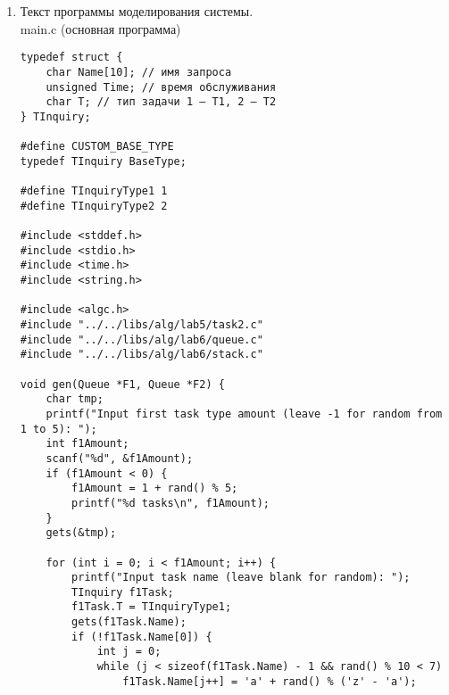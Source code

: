 \documentclass[a4paper,14pt]{extarticle}
\begin{document}
\begin{enumerate}
\begin{verbatim}
int QueueError = QueueOk; 

void InitQueue(Queue* f) {
    f->Uk1 = 0;
    f->Uk2 = 0;
    f->N = 0;

    QueueError = QueueOk;
}

void PutQueue(Queue *f, BaseType E) {
    if (f->N >= QueueSize) {
        QueueError = QueueOver;
        return;
    }

    QueueError = QueueOk;
    f->Buf[f->Uk2] = E;
    f->Uk2 = (f->Uk2 + 1) % QueueSize;
    f->N++;
}

void GetQueue(Queue *f, BaseType *E) {
    if (f->N <= 0) {
        QueueError = QueueUnder;
        return;
    }

    QueueError = QueueOk;
    *E = f->Buf[f->Uk1];
    f->Uk1 = (f->Uk1 + 1) % QueueSize;
    f->N--;
}

void ReadQueue(Queue *f, BaseType *E) {
    if (f->N <= 0) {
        QueueError = QueueUnder;
        return;
    }

    QueueError = QueueOk;
    *E = f->Buf[f->Uk1];
}

int EmptyQueue(Queue *f) {
    QueueError = QueueOk;
    
    return f->N == 0;
}
\end{verbatim}
    \item Текст программы моделирования системы.\\
          main.c (основная программа)
          \begin{verbatim}
typedef struct {
    char Name[10]; // имя запроса
    unsigned Time; // время обслуживания
    char T; // тип задачи 1 — Т1, 2 — Т2
} TInquiry;

#define CUSTOM_BASE_TYPE
typedef TInquiry BaseType;

#define TInquiryType1 1
#define TInquiryType2 2

#include <stddef.h>
#include <stdio.h>
#include <time.h>
#include <string.h>

#include <algc.h>
#include "../../libs/alg/lab5/task2.c"
#include "../../libs/alg/lab6/queue.c"
#include "../../libs/alg/lab6/stack.c"

void gen(Queue *F1, Queue *F2) {
    char tmp;
    printf("Input first task type amount (leave -1 for random from 1 to 5): ");
    int f1Amount;
    scanf("%d", &f1Amount);
    if (f1Amount < 0) {
        f1Amount = 1 + rand() % 5;
        printf("%d tasks\n", f1Amount);
    }
    gets(&tmp);

    for (int i = 0; i < f1Amount; i++) {
        printf("Input task name (leave blank for random): ");
        TInquiry f1Task;
        f1Task.T = TInquiryType1;
        gets(f1Task.Name);
        if (!f1Task.Name[0]) {
            int j = 0;
            while (j < sizeof(f1Task.Name) - 1 && rand() % 10 < 7)
                f1Task.Name[j++] = 'a' + rand() % ('z' - 'a');


\end{verbatim}
\end{enumerate}
\end{document}
